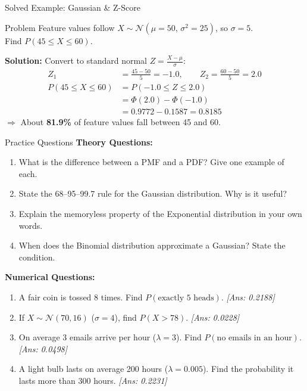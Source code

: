 \begin{frame}{Solved Example: Gaussian \& Z-Score}
\begin{exampleblock}{Problem}
Feature values follow $X \sim \mathcal{N}(\mu=50,\, \sigma^2=25)$, so $\sigma=5$.\\
Find $P(45 \leq X \leq 60)$.
\end{exampleblock}
\textbf{Solution:} Convert to standard normal $Z = \frac{X-\mu}{\sigma}$:
\begin{align*}
Z_1 &= \frac{45-50}{5} = -1.0, \qquad Z_2 = \frac{60-50}{5} = 2.0\\[6pt]
P(45 \leq X \leq 60) &= P(-1.0 \leq Z \leq 2.0)\\
                       &= \Phi(2.0) - \Phi(-1.0)\\
                       &= 0.9772 - 0.1587 = \mathbf{0.8185}
\end{align*}
$\Rightarrow$ About \textbf{81.9\%} of feature values fall between 45 and 60.
\end{frame}

\begin{frame}{Practice Questions}
\textbf{Theory Questions:}
\begin{enumerate}
    \item What is the difference between a PMF and a PDF? Give one example of each.
    \item State the 68--95--99.7 rule for the Gaussian distribution. Why is it useful?
    \item Explain the memoryless property of the Exponential distribution in your own words.
    \item When does the Binomial distribution approximate a Gaussian? State the condition.
\end{enumerate}

\vspace{6pt}
\textbf{Numerical Questions:}
\begin{enumerate}
    \item A fair coin is tossed 8 times. Find $P(\text{exactly 5 heads})$. \textit{[Ans: 0.2188]}
    \item If $X \sim \mathcal{N}(70, 16)$ ($\sigma=4$), find $P(X > 78)$. \textit{[Ans: 0.0228]}
    \item On average 3 emails arrive per hour ($\lambda=3$). Find $P(\text{no emails in an hour})$. \textit{[Ans: 0.0498]}
    \item A light bulb lasts on average 200 hours ($\lambda = 0.005$). Find the probability it lasts more than 300 hours. \textit{[Ans: 0.2231]}
\end{enumerate}
\end{frame}
